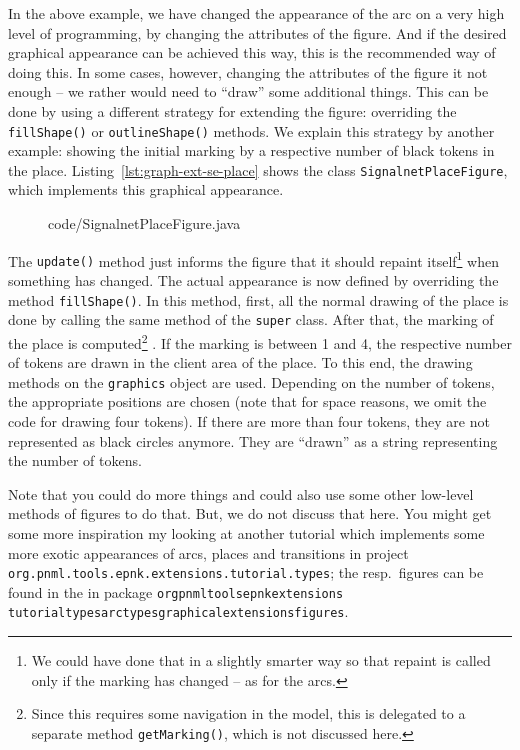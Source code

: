 In the above example, we have changed the appearance of the arc on a
very high level of programming, by changing the attributes of the figure.
And if the desired graphical appearance can be achieved this way, this
is the recommended way of doing this. In some cases, however, changing
the attributes of the figure it not enough -- we rather would need to
``draw'' some additional things. This can be done by using a different
strategy for extending the figure: overriding the {\tt fillShape()}%
or {\tt outlineShape()}
methods. We explain this strategy by another example:
showing the initial marking by a respective number of black tokens in the place.
Listing~\ref{lst:graph-ext-se-place} shows the class {\tt SignalnetPlaceFigure},
which implements this graphical appearance.
%
\begin{figure}[htbp!]
%
{code/SignalnetPlaceFigure.java}
\end{figure}
%
The {\tt update()}%
method just informs the figure that it should repaint itself\footnote
  {We could have done that in a slightly smarter way so that
   repaint is called only if the marking has changed -- as for the arcs.}
when something has changed. The actual appearance is now defined by
overriding the method {\tt fillShape()}. In this method, first, all
the normal drawing of the place is done by calling the same method of the
{\tt super} class. After that, the marking of the place is computed\footnote
  {Since this requires some navigation in the model, this is delegated
   to a separate method {\tt getMarking()}, which is not discussed here.}%
. If the marking is between 1 and 4, the respective number of tokens
are drawn in the client area of the place. To this end, the drawing
methods on the {\tt graphics} object are used. Depending on the number of
tokens, the appropriate positions are chosen (note that for space
reasons, we omit the code for drawing four tokens). If there are more than four
tokens, they are not represented as black circles anymore. They are ``drawn'' as
a string representing the number of tokens.

Note that you could do more things and could also use some other low-level
methods of figures to do that. But, we do not discuss that here. You
might get some more inspiration my looking at another tutorial which
implements some more exotic appearances of arcs, places and transitions
in project {\tt org.pnml.tools.epnk.extensions.tutorial.types}; the
resp.\ figures can be found in the in package
{\tt org\qnsep{}pnml\qnsep{}tools\qnsep{}epnk\qnsep{}extensions\qnsep{}%
tutorial\qnsep{}types\qnsep{}arctypes\qnsep{}graphicalextensions\qnsep{}figures}.

